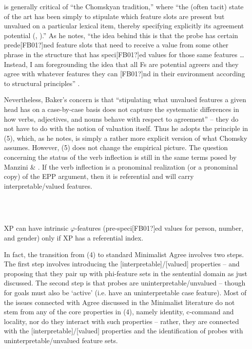 \documentclass[output=paper]{langsci/langscibook}
\begin{document}
\begin{styleSfondomedioiColorexxi}
\citet[4]{Baker2008} is generally critical of “the Chomskyan tradition,” where “the (often tacit) state of the art has been simply to stipulate which feature slots are present but unvalued on a particular lexical item, thereby specifying explicitly its agreement potential (\citealt{Chomsky2000}, \citealt{Chomsky2001}).” As he notes, “the idea behind this is that the probe has certain prede[FB01?]ned feature slots that need to receive a value from some other phrase in the structure that has speci[FB01?]ed values for those same features … Instead, I am foregrounding the idea that all Fs are potential agreers and they agree with whatever features they can [FB01?]nd in their environment according to structural principles” \citep[44]{Baker2008}.{}  
\end{styleSfondomedioiColorexxi}

\begin{styleSfondomedioiColorexxi}
Nevertheless, Baker’s concern is that “stipulating what unvalued features a given head has on a case-by-case basis does not capture the systematic differences in how verbs, adjectives, and nouns behave with respect to agreement” – they do not have to do with the notion of valuation itself. Thus he adopts the principle in (5), which, as he notes, is simply a rather more explicit version of what Chomsky assumes. However, (5) does not change the empirical picture. The question concerning the status of the verb inflection is still in the same terms posed by Manzini \& \citet{Savoia2007}. If the verb inflection is a pronominal realization (or a pronominal copy) of the EPP argument, then it is referential and will carry interpretable/valued features.
\end{styleSfondomedioiColorexxi}

\begin{styleSfondomedioiColorexxi}
\ea%
    \label{ex:key:5}
    \gll\\
        \\
    \glt
    \z

           XP can have intrinsic $\varphi $-features (pre-speci[FB01?]ed values for person, number, and gender) only if XP has a referential index.
\end{styleSfondomedioiColorexxi}

\begin{styleSfondomedioiColorexxi}
In fact, the transition from (4) to standard Minimalist Agree involves two steps. The first step involves introducing the [interpretable]/[valued] properties – and proposing that they pair up with phi-feature sets in the sentential domain as just discussed. The second step is that probes are uninterpretable/unvalued – though for \citet{Chomsky2001} goals must also be ‘active’ (i.e. have an uninterpretable case feature). Most of the issues connected with Agree discussed in the Minimalist literature do not stem from any of the core properties in (4), namely identity, c-command and locality, nor do they interact with such properties – rather, they are connected with the [interpretable]/[valued] properties and the identification of probes with uninterpretable/unvalued feature sets. 
\end{styleSfondomedioiColorexxi}
\end{document}
